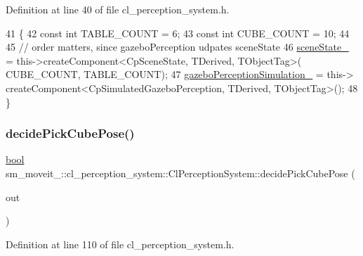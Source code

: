 Definition at line 40 of file cl\+\_\+perception\+\_\+system.\+h.


\begin{DoxyCode}
41             \{
42                 \textcolor{keyword}{const} \textcolor{keywordtype}{int} TABLE\_COUNT = 6;
43                 \textcolor{keyword}{const} \textcolor{keywordtype}{int} CUBE\_COUNT = 10;
44 
45                 \textcolor{comment}{// order matters, since gazeboPerception udpates sceneState}
46                 \hyperlink{classsm__moveit__4_1_1cl__perception__system_1_1ClPerceptionSystem_a82ea8feeb2fa43349f91ed59137b3890}{sceneState\_} = this->createComponent<CpSceneState, TDerived, TObjectTag>(
      CUBE\_COUNT, TABLE\_COUNT);
47                 \hyperlink{classsm__moveit__4_1_1cl__perception__system_1_1ClPerceptionSystem_a027c07df3f1a2cc0c30be111b27dbe5c}{gazeboPerceptionSimulation\_} = this->
      createComponent<CpSimulatedGazeboPerception, TDerived, TObjectTag>();
48             \}
\end{DoxyCode}
\mbox{\label{classsm__moveit__4_1_1cl__perception__system_1_1ClPerceptionSystem_af1143d68db667021480383673244bb04}} 
\subsubsection{\texorpdfstring{decide\+Pick\+Cube\+Pose()}{decidePickCubePose()}}
{\footnotesize\ttfamily \hyperlink{classbool}{bool} sm\+\_\+moveit\+\_\+::cl\+\_\+perception\+\_\+system\+::\+Cl\+Perception\+System\+::decide\+Pick\+Cube\+Pose (\begin{DoxyParamCaption}\item[{geometry\+\_\+msgs\+::\+Pose\+Stamped \&}]{out }\end{DoxyParamCaption})\hspace{0.3cm}{\ttfamily [inline]}}



Definition at line 110 of file cl\+\_\+perception\+\_\+system.\+h.


